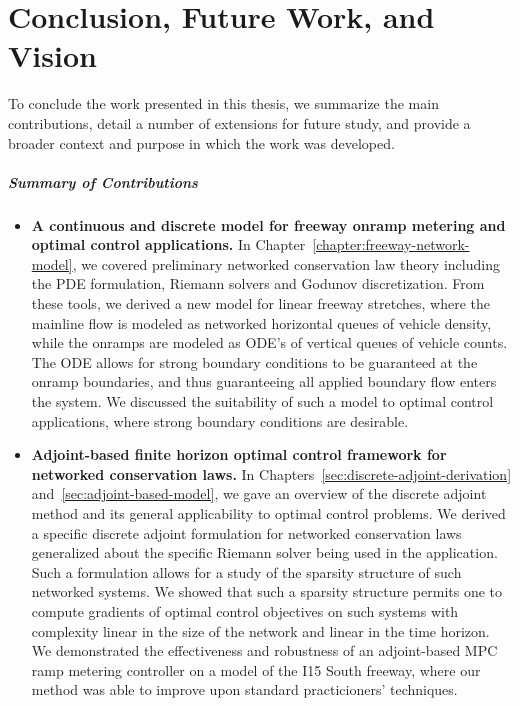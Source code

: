 \chapter{Conclusion, Future Work, and Vision}

To conclude the work presented in this thesis, we summarize the main contributions, detail a number of extensions for future study, and provide a broader context and purpose in which the work was developed.

\paragraph*{Summary of Contributions}

\begin{itemize}
	\item \textbf{A continuous and discrete model for freeway onramp metering and optimal control applications.} In Chapter~\ref{chapter:freeway-network-model}, we covered preliminary networked conservation law theory including the PDE formulation, Riemann solvers and Godunov discretization. From these tools, we derived a new model for linear freeway stretches, where the mainline flow is modeled as networked horizontal queues of vehicle density, while the onramps are modeled as ODE's of vertical queues of vehicle counts. The ODE allows for strong boundary conditions to be guaranteed at the onramp boundaries, and thus guaranteeing all applied boundary flow enters the system. We discussed the suitability of such a model to optimal control applications, where strong boundary conditions are desirable.
	\item \textbf{Adjoint-based finite horizon optimal control framework for networked conservation laws.} In Chapters~\ref{sec:discrete-adjoint-derivation} and~\ref{sec:adjoint-based-model}, we gave an overview of the discrete adjoint method and its general applicability to optimal control problems. We derived a specific discrete adjoint formulation for networked conservation laws generalized about the specific Riemann solver being used in the application. Such a formulation allows for a study of the sparsity structure of such networked systems. We showed that such a sparsity structure permits one to compute gradients of optimal control objectives on such systems with complexity linear in the size of the network and linear in the time horizon. We demonstrated the effectiveness and robustness of an adjoint-based MPC ramp metering controller on a model of the I15 South freeway, where our method was able to improve upon standard practicioners' techniques.

\end{itemize}
